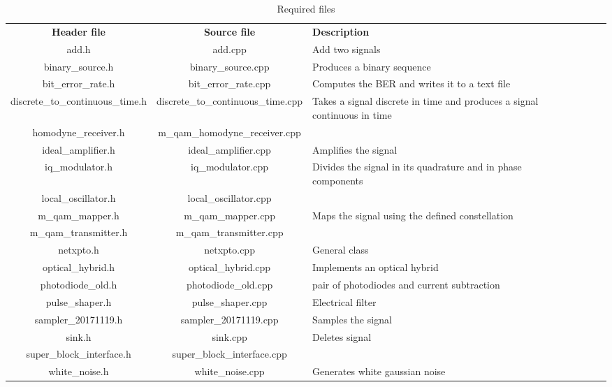 \begin{table}[]
 	\centering
 	\caption{Required files}
 	\begin{tabular}{|c|c|p{50mm}|ccp{50mm}}
 		\cline{1-3}
 		\textbf{Header file} & \textbf{Source file} & \textbf{Description} &    \\ \cline{1-3}
 		add.h & add.cpp & Add two signals  &    \\ \cline{1-3}
 		binary\_source.h & binary\_source.cpp & Produces a binary sequence \\ \cline{1-3}
 		bit\_error\_rate.h & bit\_error\_rate.cpp & Computes the BER and writes it to a text file \\ \cline{1-3}
 		discrete\_to\_continuous\_time.h & discrete\_to\_continuous\_time.cpp & Takes a signal discrete in time and produces a signal continuous in time \\ \cline{1-3}
 		homodyne\_receiver.h & m\_qam\_homodyne\_receiver.cpp & \\ \cline{1-3}
 		ideal\_amplifier.h & ideal\_amplifier.cpp & Amplifies the signal \\ \cline{1-3}
 		iq\_modulator.h & iq\_modulator.cpp & Divides the signal in its quadrature and in phase components \\ \cline{1-3}
 		local\_oscillator.h & local\_oscillator.cpp & & \\ \cline{1-3}
 		m\_qam\_mapper.h & m\_qam\_mapper.cpp & Maps the signal using the defined constellation \\ \cline{1-3}
 		m\_qam\_transmitter.h & m\_qam\_transmitter.cpp & & \\ \cline{1-3}
 		netxpto.h & netxpto.cpp & General class \\ \cline{1-3}
 		optical\_hybrid.h & optical\_hybrid.cpp & Implements an optical hybrid \\ \cline{1-3}
 		photodiode\_old.h & photodiode\_old.cpp & pair of photodiodes and current subtraction \\ \cline{1-3}
 		pulse\_shaper.h & pulse\_shaper.cpp & Electrical filter \\ \cline{1-3}
 		sampler\_20171119.h & sampler\_20171119.cpp & Samples the signal \\ \cline{1-3}
 		sink.h & sink.cpp & Deletes signal \\ \cline{1-3}
 		super\_block\_interface.h & super\_block\_interface.cpp & & \\ \cline{1-3}
 		white\_noise.h & white\_noise.cpp & Generates white gaussian noise \\ \cline{1-3}  
 	\end{tabular}
 	\label{table:files}
\end{table}

